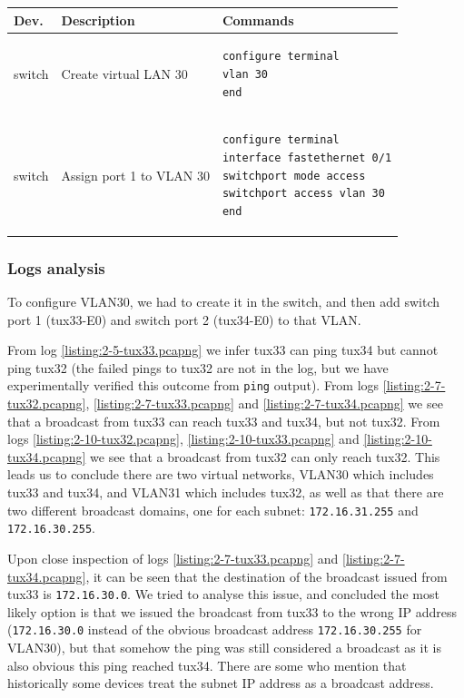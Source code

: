 \documentclass[a4paper, 11pt]{report}
\begin{document}
\begin{center}
    \small
    \begin{tabular}{@{}l | m{103mm} | l@{}}
        {\normalfont\textbf{Dev.}} & {\normalfont\textbf{Description}} & {\normalfont\textbf{Commands}}  \\ \hline
        switch        & Create virtual LAN 30                                 &
            \begin{lstlisting}[basicstyle=\linespread{0.85}\ttfamily\small, frame=none, numbers=none, language=cisco]
configure terminal
vlan 30
end
            \end{lstlisting} \\
        switch        & Assign port 1 to VLAN 30                              & 
            \begin{lstlisting}[basicstyle=\linespread{0.85}\ttfamily\small, frame=none, numbers=none, language=cisco]
configure terminal
interface fastethernet 0/1
switchport mode access
switchport access vlan 30
end
            \end{lstlisting} \\
    \end{tabular}
\end{center}

\subsubsection{Logs analysis} \label{sec:Log2}

To configure VLAN30, we had to create it in the switch, and then add switch port 1 (tux33-E0) and switch port 2 (tux34-E0) to that VLAN.

From log \ref{listing:2-5-tux33.pcapng} we infer tux33 can ping tux34 but cannot ping tux32 (the failed pings to tux32 are not in the log, but we have experimentally verified this outcome from \texttt{ping} output).
From logs \ref{listing:2-7-tux32.pcapng}, \ref{listing:2-7-tux33.pcapng} and \ref{listing:2-7-tux34.pcapng} we see that a broadcast from tux33 can reach tux33 and tux34, but not tux32.
From logs \ref{listing:2-10-tux32.pcapng}, \ref{listing:2-10-tux33.pcapng} and \ref{listing:2-10-tux34.pcapng} we see that a broadcast from tux32 can only reach tux32.
This leads us to conclude there are two virtual networks, VLAN30 which includes tux33 and tux34, and VLAN31 which includes tux32, as well as that there are two different broadcast domains, one for each subnet: \texttt{172.16.31.255} and \texttt{172.16.30.255}.

Upon close inspection of logs \ref{listing:2-7-tux33.pcapng} and \ref{listing:2-7-tux34.pcapng}, it can be seen that the destination of the broadcast issued from tux33 is \texttt{172.16.30.0}.
We tried to analyse this issue, and concluded the most likely option is that we issued the broadcast from tux33 to the wrong IP address (\texttt{172.16.30.0} instead of the obvious broadcast address \texttt{172.16.30.255} for VLAN30), but that somehow the ping was still considered a broadcast as it is also obvious this ping reached tux34.
There are some \cite{ping-subnet-address-1}\cite{ping-subnet-address-2} who mention that historically some devices treat the subnet IP address as a broadcast address.
\end{document}
